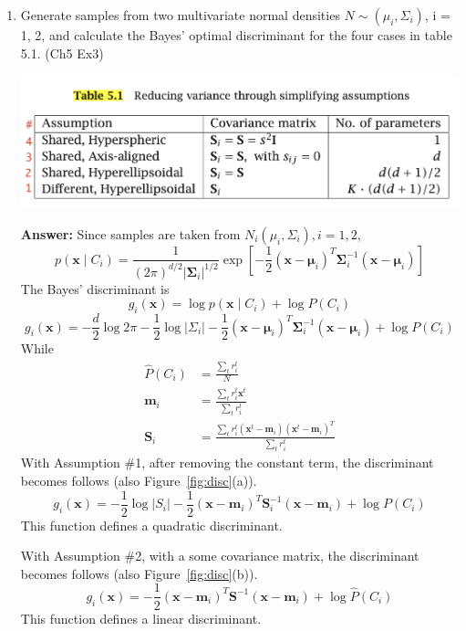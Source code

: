 \documentclass{article}
\begin{document}
\begin{enumerate}
    \item  Generate samples from two multivariate normal densities $N\sim(\mu_i, \Sigma_i)$, i = 1, 2, and calculate the Bayes’ optimal discriminant for the four cases in table 5.1. (Ch5 Ex3)%
    \begin{center}
        \includegraphics[width=0.8\linewidth]{table5.1.png}
    \end{center}
    \textbf{Answer:} 
    Since samples are taken from $N_i(\mu_i, \Sigma_i), i=1,2$,
    $$
    p\left(\boldsymbol{x} \mid C_i\right)=\frac{1}{(2 \pi)^{d / 2}\left|\boldsymbol{\Sigma}_i\right|^{1 / 2}} \exp \left[-\frac{1}{2}\left(\boldsymbol{x}-\boldsymbol{\mu}_i\right)^T \boldsymbol{\Sigma}_i^{-1}\left(\boldsymbol{x}-\boldsymbol{\mu}_i\right)\right]
    $$
    The Bayes' discriminant is 
    $$
    g_i(\boldsymbol{x})=\log p\left(\boldsymbol{x} \mid C_i\right)+\log P\left(C_i\right)
    $$
    $$
    g_i(\boldsymbol{x})=-\frac{d}{2} \log 2 \pi-\frac{1}{2} \log \left|\Sigma_i\right|-\frac{1}{2}\left(\boldsymbol{x}-\boldsymbol{\mu}_i\right)^T \boldsymbol{\Sigma}_i^{-1}\left(\boldsymbol{x}-\boldsymbol{\mu}_i\right)+\log P\left(C_i\right)
    $$
    While
    $$
    \begin{aligned}
    \hat{P}\left(C_i\right) &=\frac{\sum_t r_i^t}{N} \\
    \boldsymbol{m}_i &=\frac{\sum_t r_i^t \boldsymbol{x}^t}{\sum_t r_i^t} \\
    \mathbf{S}_i &=\frac{\sum_t r_i^t\left(\boldsymbol{x}^t-\boldsymbol{m}_i\right)\left(\boldsymbol{x}^t-\boldsymbol{m}_i\right)^T}{\sum_t r_i^t}
    \end{aligned}
    $$
    With Assumption \#1, after removing the constant term, the discriminant becomes follows (also Figure~\ref{fig:disc}(a)).
    $$
    g_i(\boldsymbol{x})=-\frac{1}{2} \log \left|S_i\right|-\frac{1}{2}\left(\boldsymbol{x}-\boldsymbol{m}_i\right)^T \boldsymbol{S}_i^{-1}\left(\boldsymbol{x}-\boldsymbol{m}_i\right)+\log P\left(C_i\right)
    $$
    This function defines a quadratic discriminant.

    With Assumption \#2, with a some covariance matrix, the discriminant becomes follows (also Figure~\ref{fig:disc}(b)).
    $$
    g_i(\boldsymbol{x})=-\frac{1}{2}\left(\boldsymbol{x}-\boldsymbol{m}_i\right)^T \mathbf{S}^{-1}\left(\boldsymbol{x}-\boldsymbol{m}_i\right)+\log \hat{P}\left(C_i\right)
    $$
    This function defines a linear discriminant.


\end{enumerate}
\end{document}
